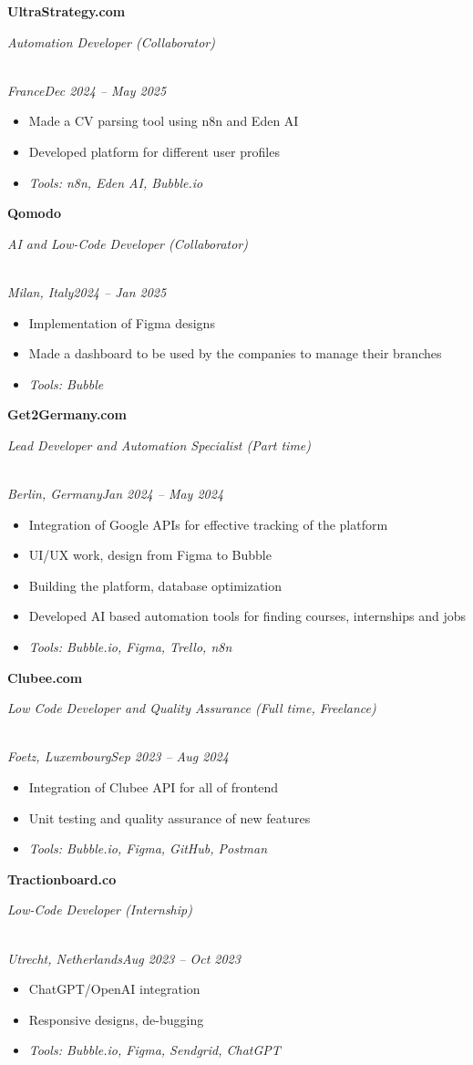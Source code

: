 \documentclass[a4paper,10pt]{article}
\newcommand{\role}[4]{\vspace{3pt}\noindent\hspace{0.6em}\parbox[t]{0.38\textwidth}{\raggedright\textbf{#1}}\hfill\parbox[t]{0.58\textwidth}{\raggedleft\textit{#2}}\\{\textit{#3}\hfill\textit{#4}}\vspace{1pt}}
\begin{document}
\role{UltraStrategy.com}{Automation Developer (Collaborator)}{France}{Dec 2024 -- May 2025}
\begin{itemize}
\item Made a CV parsing tool using n8n and Eden AI
\item Developed platform for different user profiles
\item \textit{Tools: n8n, Eden AI, Bubble.io}
\end{itemize}

\role{Qomodo}{AI and Low-Code Developer (Collaborator)}{Milan, Italy}{2024 -- Jan 2025}
\begin{itemize}
\item Implementation of Figma designs
\item Made a dashboard to be used by the companies to manage their branches
\item \textit{Tools: Bubble}
\end{itemize}

\role{Get2Germany.com}{Lead Developer and Automation Specialist (Part time)}{Berlin, Germany}{Jan 2024 -- May 2024}
\begin{itemize}
\item Integration of Google APIs for effective tracking of the platform
\item UI/UX work, design from Figma to Bubble
\item Building the platform, database optimization
\item Developed AI based automation tools for finding courses, internships and jobs
\item \textit{Tools: Bubble.io, Figma, Trello, n8n}
\end{itemize}

\role{Clubee.com}{Low Code Developer and Quality Assurance (Full time, Freelance)}{Foetz, Luxembourg}{Sep 2023 -- Aug 2024}
\begin{itemize}
\item Integration of Clubee API for all of frontend
\item Unit testing and quality assurance of new features
\item \textit{Tools: Bubble.io, Figma, GitHub, Postman}
\end{itemize}

\role{Tractionboard.co}{Low-Code Developer (Internship)}{Utrecht, Netherlands}{Aug 2023 -- Oct 2023}
\begin{itemize}
\item ChatGPT/OpenAI integration
\item Responsive designs, de-bugging
\item \textit{Tools: Bubble.io, Figma, Sendgrid, ChatGPT}
\end{itemize}
\end{document}
